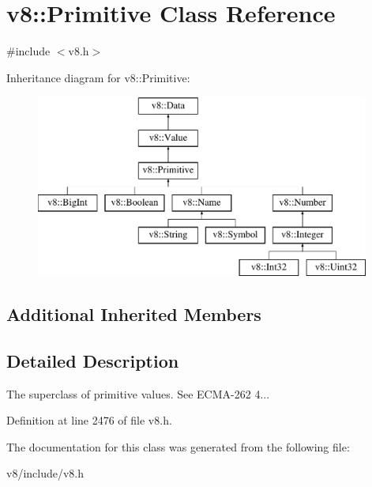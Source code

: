 \hypertarget{classv8_1_1Primitive}{}\section{v8\+:\+:Primitive Class Reference}
\label{classv8_1_1Primitive}


{\ttfamily \#include $<$v8.\+h$>$}

Inheritance diagram for v8\+:\+:Primitive\+:\begin{figure}[H]
\begin{center}
\leavevmode
\includegraphics[height=6.000000cm]{classv8_1_1Primitive}
\end{center}
\end{figure}
\subsection*{Additional Inherited Members}


\subsection{Detailed Description}
The superclass of primitive values. See E\+C\+M\+A-\/262 4... 

Definition at line 2476 of file v8.\+h.



The documentation for this class was generated from the following file\+:\begin{DoxyCompactItemize}
\item 
v8/include/v8.\+h\end{DoxyCompactItemize}
